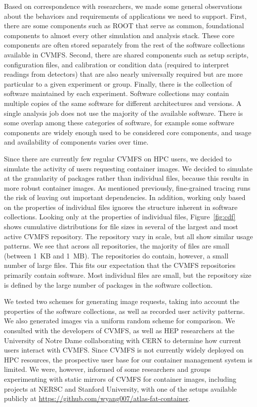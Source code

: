 \documentclass[sigconf]{acmart}
\begin{document}
Based on correspondence with researchers,
we made some general observations about the behaviors and requirements of applications we need to support.
First, there are some components such as ROOT that serve as common, foundational components to almost every other simulation and analysis stack.
These core components are often stored separately from the rest of the software collections available in CVMFS.
Second, there are shared components such as setup scripts, configuration files, and calibration or condition data (required to interpret readings from detectors) that are also nearly universally required but are more particular to a given experiment or group.
Finally, there is the collection of software maintained by each experiment.
Software collections may contain multiple copies of the same software for different architectures and versions.
A single analysis job does not use the majority of the available software.
There is some overlap among these categories of software,
for example some software components are widely enough used to be considered core components,
and usage and availability of components varies over time.
\fi

    Since there are currently few regular CVMFS on HPC users,
we decided to simulate the activity of users requesting container images.
We decided to simulate at the granularity of packages rather than individual files,
because this results in more robust container images.
As mentioned previously,
fine-grained tracing runs the risk of leaving out important dependencies.
In addition, working only based on the properties of individual files ignores the structure inherent in software collections.
Looking only at the properties of individual files,
Figure~\ref{fig:cdf} shows cumulative distributions for file sizes in several of the largest and most active CVMFS repository.
The repository vary in scale,
but all show similar usage patterns.
We see that across all repositories,
the majority of files are small (between 1~KB and 1~MB).
The repositories do contain, however,
a small number of large files.
This fits our expectation that the CVMFS repositories primarily contain software.
Most individual files are small,
but the repository size is defined by the large number of packages in the software collection.

We tested two schemes for generating image requests, taking into account the properties of the software collections,
as well as recorded user activity patterns.
We also generated images via a uniform random scheme for comparison.
We consulted with the developers of CVMFS,
as well as HEP researchers at the University of Notre Dame collaborating with CERN to determine how current users interact with CVMFS.
Since CVMFS is not currently widely deployed on HPC resources,
the prospective user base for our container management system is limited.
We were, however, informed of some researchers and groups experimenting with static mirrors of CVMFS for container images,
including projects at NERSC and Stanford University,
with one of the setups available publicly at \url{https://github.com/wyang007/atlas-fat-container}.
    
\end{document}
